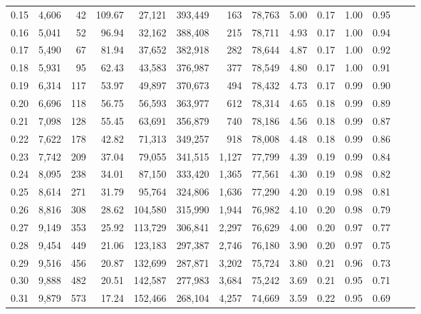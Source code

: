 \begin{tabular}{rrrrrrrrrrrrrr}
0.15 &   4,606 &     42 &  109.67 &   27,121 &  393,449 &     163 &  78,763 &  5.00 &  0.17 &  1.00 &      0.95 \\
0.16 &   5,041 &     52 &   96.94 &   32,162 &  388,408 &     215 &  78,711 &  4.93 &  0.17 &  1.00 &      0.94 \\
0.17 &   5,490 &     67 &   81.94 &   37,652 &  382,918 &     282 &  78,644 &  4.87 &  0.17 &  1.00 &      0.92 \\
0.18 &   5,931 &     95 &   62.43 &   43,583 &  376,987 &     377 &  78,549 &  4.80 &  0.17 &  1.00 &      0.91 \\
0.19 &   6,314 &    117 &   53.97 &   49,897 &  370,673 &     494 &  78,432 &  4.73 &  0.17 &  0.99 &      0.90 \\
0.20 &   6,696 &    118 &   56.75 &   56,593 &  363,977 &     612 &  78,314 &  4.65 &  0.18 &  0.99 &      0.89 \\
0.21 &   7,098 &    128 &   55.45 &   63,691 &  356,879 &     740 &  78,186 &  4.56 &  0.18 &  0.99 &      0.87 \\
0.22 &   7,622 &    178 &   42.82 &   71,313 &  349,257 &     918 &  78,008 &  4.48 &  0.18 &  0.99 &      0.86 \\
0.23 &   7,742 &    209 &   37.04 &   79,055 &  341,515 &   1,127 &  77,799 &  4.39 &  0.19 &  0.99 &      0.84 \\
0.24 &   8,095 &    238 &   34.01 &   87,150 &  333,420 &   1,365 &  77,561 &  4.30 &  0.19 &  0.98 &      0.82 \\
0.25 &   8,614 &    271 &   31.79 &   95,764 &  324,806 &   1,636 &  77,290 &  4.20 &  0.19 &  0.98 &      0.81 \\
0.26 &   8,816 &    308 &   28.62 &  104,580 &  315,990 &   1,944 &  76,982 &  4.10 &  0.20 &  0.98 &      0.79 \\
0.27 &   9,149 &    353 &   25.92 &  113,729 &  306,841 &   2,297 &  76,629 &  4.00 &  0.20 &  0.97 &      0.77 \\
0.28 &   9,454 &    449 &   21.06 &  123,183 &  297,387 &   2,746 &  76,180 &  3.90 &  0.20 &  0.97 &      0.75 \\
0.29 &   9,516 &    456 &   20.87 &  132,699 &  287,871 &   3,202 &  75,724 &  3.80 &  0.21 &  0.96 &      0.73 \\
0.30 &   9,888 &    482 &   20.51 &  142,587 &  277,983 &   3,684 &  75,242 &  3.69 &  0.21 &  0.95 &      0.71 \\
0.31 &   9,879 &    573 &   17.24 &  152,466 &  268,104 &   4,257 &  74,669 &  3.59 &  0.22 &  0.95 &      0.69 \\

\end{tabular}
